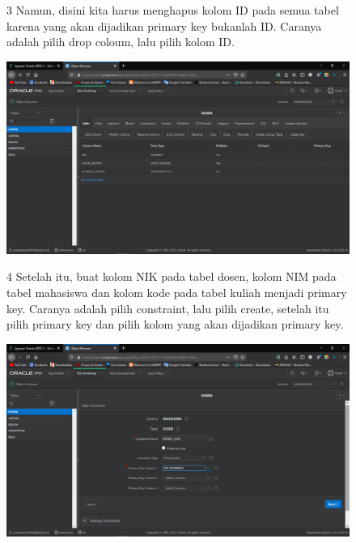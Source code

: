 \begin{enumerate}
\begin{figure}[!htbp]    
\item[3] Namun, disini kita harus menghapus kolom ID pada semua tabel karena yang akan dijadikan primary key bukanlah ID. Caranya adalah pilih drop coloum, lalu pilih kolom ID.
\begin{center}
    \includegraphics[scale=0.3]{figures/Screenshot(45).png}
    \end{center}
    \end{figure}

\begin{figure}[!htbp]
\item[4] Setelah itu, buat kolom NIK pada tabel dosen, kolom NIM pada tabel mahasiswa dan kolom kode pada tabel kuliah menjadi primary key. Caranya adalah pilih constraint, lalu pilih create, setelah itu pilih primary key dan pilih kolom yang akan dijadikan primary key.
\begin{center}
    \includegraphics[scale=0.3]{figures/Screenshot(53).png}
    \end{center}
    \end{figure}


\end{enumerate}
